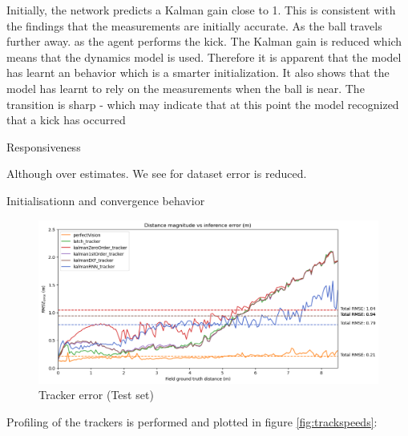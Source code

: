 \documentclass[a4paper,twoside,12pt]{report}
\begin{document}


Initially, the network predicts a Kalman gain close to 1. This is consistent with the findings that the measurements are initially accurate. As the ball travels further away. as the agent performs the kick. The Kalman gain is reduced which means that the dynamics model is used. Therefore it is apparent that the model has learnt an behavior which is a smarter initialization. It also shows that the model has learnt to rely on the measurements when the ball is near.  The transition is sharp - which may indicate that at this point the model recognized that a kick has occurred

Responsiveness

Although over estimates. We see for dataset error is reduced.

Initialisationn and convergence behavior

\begin{figure}[h!]
\begin{center}
\includegraphics[width=13cm]{images/eval_error.png}
\caption{Tracker error (Test set)}
\label{fig:evalerror}
\end{center}
\end{figure}

Profiling of the trackers is performed and plotted in figure \ref{fig:trackspeeds}:
\end{document}
